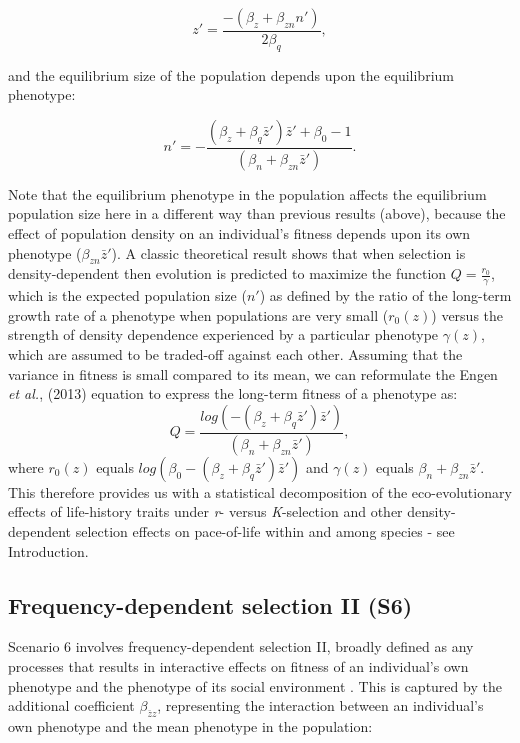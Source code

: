 \documentclass{article}
\begin{document}
\begin{equation} 
z'=\frac{-(\beta_{z}+\beta_{zn}n')}{2\beta_{q}},
\end{equation} 

and the equilibrium size of the population depends upon the equilibrium phenotype:

\begin{equation} \label{eq: equilibrium DDRS}
		n' = -\frac{(\beta_{z}  +  \beta_{q}\bar{z}')\bar{z}'+\beta_{0} -1}{(\beta_{n} +  \beta_{zn} \bar{z}')}.
\end{equation}

\noindent Note that the equilibrium phenotype in the population affects the equilibrium population size here in a different way than previous results (above), because the effect of population density on an individual's fitness depends upon its own phenotype ($\beta_{zn} \bar{z}'$). A classic theoretical result \citep{MacArthur1962, Engen2013} shows that when selection is density-dependent then evolution is predicted to maximize the function $Q=\frac{r_0}{\gamma}$, which is the expected population size ($n'$) as defined by the ratio of the long-term growth rate of a phenotype when populations are very small ($r_0(z)$) versus the strength of density dependence experienced by a particular phenotype $\gamma(z)$,  which are assumed to be traded-off against each other.  Assuming that the variance in fitness is small compared to its mean, we can reformulate the Engen \textit{et al.}, (2013) equation to express the long-term fitness of a phenotype as:  $$Q=\frac{log(-(\beta_{z}  +  \beta_{q}\bar{z}')\bar{z}')}{(\beta_{n} +  \beta_{zn} \bar{z}')},$$ where  $r_0(z)$ equals $log(\beta_{0}-(\beta_{z}  +  \beta_{q}\bar{z}')\bar{z}')$ and $\gamma(z)$ equals $\beta_{n} + \beta_{zn} \bar{z}'$. This therefore provides us with a statistical decomposition of the eco-evolutionary effects of life-history traits under \textit{r}- versus \textit{K}-selection \citep{macarthur1967theory, Engen2013} and other density-dependent selection effects on pace-of-life within and among species \citep{Wright2018} - see Introduction.
 
\subsection{Frequency-dependent selection II (S6)}

 Scenario 6 involves frequency-dependent selection II, broadly defined as any processes that results in interactive effects on fitness of an individual's own phenotype and the phenotype of its social environment \citep{Araya-Ajoy2020}. This is captured by the additional coefficient $\beta_{\bar{z}z}$, representing the interaction between an individual's own phenotype and the mean phenotype in the population:  
\end{document}

